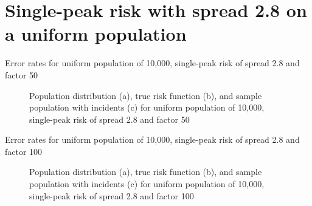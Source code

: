  
\section{Single-peak risk with spread 2.8 on a uniform population}
\label{sec:app:results_unif_2.8_1h}

\graphicspath{{./results/unif_50_2.8_1h/}}
\makeatletter
{}
\makeatother

\begin{table}[H]
    
    \caption[]{Error rates for uniform population of 10,000, single-peak risk of \gls{spread} 2.8 and \gls{factor} 50}
    \label{tab:mean_error_rates:unif_50_2.8_1h}
\end{table}

\begin{figure}[H]
    
    \caption[]{Population distribution (a), true risk function (b), and sample population with incidents (c) for uniform population of 10,000, single-peak risk of \gls{spread} 2.8 and \gls{factor} 50}
    \label{fig:distributions:unif_50_2.8_1h}    
\end{figure}


\graphicspath{{./results/unif_100_2.8_1h/}}
\makeatletter
{}
\makeatother

\begin{table}[H]

\caption[]{Error rates for uniform population of 10,000, single-peak risk of \gls{spread} 2.8 and \gls{factor} 100}
\label{tab:mean_error_rates:unif_100_2.8_1h}
\end{table}

\begin{figure}[H]
    
    \caption[]{Population distribution (a), true risk function (b), and sample population with incidents (c) for uniform population of 10,000, single-peak risk of \gls{spread} 2.8 and \gls{factor} 100}
    \label{fig:distributions:unif_100_2.8_1h}    
\end{figure}


\graphicspath{{./results/unif_200_2.8_1h/}}
\makeatletter
{}
\makeatother


